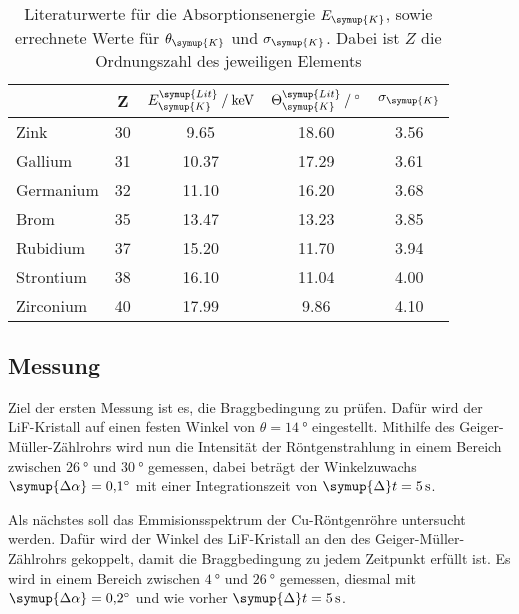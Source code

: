 \begin{table} [H]
    \centering
    \caption{Literaturwerte für die Absorptionsenergie $E_{\symup{K}}$, sowie errechnete Werte für
            $\theta_{\symup{K}}$ und $\sigma_{\symup{K}}$. Dabei ist $Z$ die Ordnungszahl des jeweiligen Elements \cite{Ekabs}}
    \label{tab:theoriewerte}
    \begin{tabular}{l c S S S}
        \toprule
         & Z & {$E_{\symup{K}}^{\symup{Lit}} \mathbin{/} \unit{\kilo\electronvolt}$} & 
         {$\Theta_{\symup{K}}^{\symup{Lit}} \mathbin{/} \unit{\degree}$} & {$\sigma_{\symup{K}}$} \\
        \midrule
        Zink         & 30 &  9.65 & 18.60 & 3.56 \\
        Gallium      & 31 & 10.37 & 17.29 & 3.61 \\
        Germanium    & 32 & 11.10 & 16.20 & 3.68 \\
        Brom         & 35 & 13.47 & 13.23 & 3.85 \\
        Rubidium     & 37 & 15.20 & 11.70 & 3.94 \\
        Strontium    & 38 & 16.10 & 11.04 & 4.00 \\
        Zirconium    & 40 & 17.99 &  9.86 & 4.10 \\
    \bottomrule
    \end{tabular}
\end{table}

\subsection{Messung}

Ziel der ersten Messung ist es, die Braggbedingung zu prüfen. Dafür wird der LiF-Kristall auf einen festen Winkel
von $\theta=\qty{14}{\degree}$ eingestellt. Mithilfe des Geiger-Müller-Zählrohrs wird nun die Intensität der Röntgenstrahlung
in einem Bereich zwischen $\qty{26}{\degree}$ und $\qty{30}{\degree}$ gemessen, dabei beträgt der Winkelzuwachs
$\symup{\Delta\alpha}=\qty{0.1}{\degree}$ mit einer Integrationszeit von $\symup{\Delta} t=\qty{5}{\second}$.

Als nächstes soll das Emmisionsspektrum der Cu-Röntgenröhre untersucht werden. Dafür wird der Winkel des LiF-Kristall an den des
Geiger-Müller-Zählrohrs gekoppelt, damit die Braggbedingung zu jedem Zeitpunkt erfüllt ist.
Es wird in einem Bereich zwischen $\qty{4}{\degree}$ und $\qty{26}{\degree}$ gemessen, diesmal mit
$\symup{\Delta\alpha}=\qty{0.2}{\degree}$ und wie vorher $\symup{\Delta} t=\qty{5}{\second}$.

